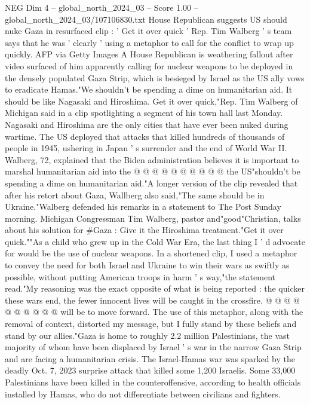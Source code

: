 \begin{textsample}{NEG Dim 4 – global\_north\_2024\_03 – Score 1.00 – global\_north\_2024\_03/107106830.txt}  \label{ex:f4_neg_223}
House Republican suggests US should nuke Gaza in resurfaced clip : ' Get it over quick ' Rep.
Tim Walberg ' s team says that he was ' clearly ' using a metaphor to call for the conflict to wrap up quickly.
AFP via Getty Images A House Republican is weathering fallout after video surfaced of him apparently calling for nuclear weapons to be deployed in the densely populated Gaza Strip, which is besieged by Israel as the US ally vows to eradicate Hamas."We shouldn't be spending a dime on humanitarian aid.
It should be like Nagasaki and Hiroshima.
Get it over quick,"Rep.
Tim Walberg of Michigan said in a clip spotlighting a segment of his town hall last Monday.
Nagasaki and Hiroshima are the only cities that have ever been nuked during wartime.
The US deployed that attacks that killed hundreds of thousands of people in 1945, ushering in Japan ' s surrender and the end of World War II.
Walberg, 72, explained that the Biden administration believes it is important to marshal humanitarian aid into the @ @ @ @ @ @ @ @ @ @ the US"shouldn't be spending a dime on humanitarian aid."A longer version of the clip revealed that after his retort about Gaza, Wallberg also said,"The same should be in Ukraine."Walberg defended his remarks in a statement to The Post Sunday morning.
Michigan Congressman Tim Walberg, pastor and"good"Christian, talks about his solution for \#Gaza : Give it the Hiroshima treatment."Get it over quick.""As a child who grew up in the Cold War Era, the last thing I ' d advocate for would be the use of nuclear weapons.
In a shortened clip, I used a metaphor to convey the need for both Israel and Ukraine to win their wars as swiftly as possible, without putting American troops in harm ' s way,"the statement read."My reasoning was the exact opposite of what is being reported : the quicker these wars end, the fewer innocent lives will be caught in the crossfire. @ @ @ @ @ @ @ @ @ @ will be to move forward.
The use of this metaphor, along with the removal of context, distorted my message, but I fully stand by these beliefs and stand by our allies."Gaza is home to roughly 2.2 million Palestinians, the vast majority of whom have been displaced by Israel ' s war in the narrow Gaza Strip and are facing a humanitarian crisis.
The Israel-Hamas war was sparked by the deadly Oct. 7, 2023 surprise attack that killed some 1,200 Israelis.
Some 33,000 Palestinians have been killed in the counteroffensive, according to health officials installed by Hamas, who do not differentiate between civilians and fighters.

\end{textsample}
